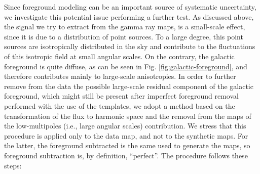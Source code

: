 Since foreground modeling can be an important source of systematic uncertainty,  we investigate this potential issue performing a further test. 
As discussed above, the signal we try to extract from the gamma ray maps, is a small-scale effect, since it is due to a distribution of point sources. To a large degree, this point sources are isotropically distributed in the sky and contribute to the fluctuations of this isotropic field at small angular scales. On the contrary, the galactic foreground is quite diffuse, as can be seen in Fig. \ref{fig:galactic-foreground}, and therefore contributes mainly to large-scale anisotropies. 
In order to further remove from the data the possible large-scale residual component of the galactic foreground, which might still be present after imperfect foreground removal performed with the use of the templates, we adopt a method based on the transformation of the flux to harmonic space and the removal from the maps of the low-multipoles (i.e., large angular scales) contribution. 
We stress that this procedure is applied only to the \fermi data map, and  not to the synthetic maps. For the latter, the foreground subtracted is the same used to generate the maps, so foreground subtraction is, by definition, ``perfect''. 
The procedure follows these steps:

